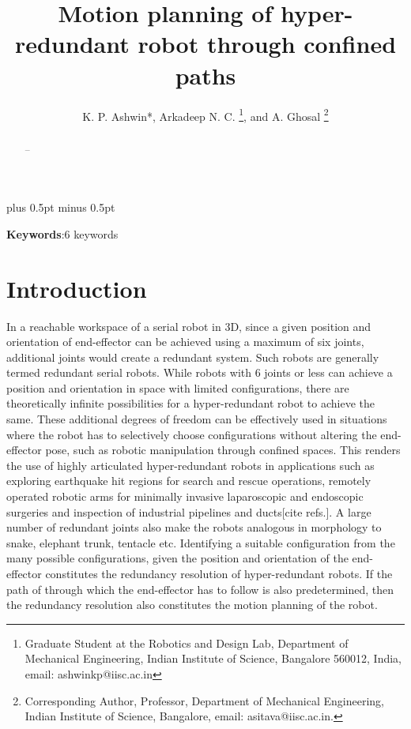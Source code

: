 \documentclass[12pt,a4]{article}
\begin{document}
%
\title{Motion planning of hyper-redundant robot through confined paths}
%
%
\author{K. P. Ashwin*, Arkadeep N. C.
\thanks{Graduate Student at the Robotics and Design Lab, Department
of Mechanical Engineering, Indian Institute of Science, Bangalore 560012, India, email: ashwinkp@iisc.ac.in}, 
 and A. Ghosal
\thanks{Corresponding Author, Professor, Department of Mechanical Engineering, Indian Institute of Science, Bangalore, email: asitava@iisc.ac.in.}}
%
\baselineskip 18pt plus 0.5pt minus 0.5pt
%
\date{}
\maketitle
\begin{abstract}
\label{sec:abstract}
--
\end{abstract}

\textbf{Keywords}:6 keywords

\section{Introduction}
\label{sec:introduction}

In a reachable workspace of a serial robot in 3D, since a given position and orientation of end-effector can be achieved using a maximum of six joints, additional joints would create a redundant system. Such robots are generally termed redundant serial robots. While robots with 6 joints  or less can achieve a position and orientation in space with limited configurations, there are theoretically infinite possibilities for a hyper-redundant robot to achieve the same. These additional degrees of freedom can be effectively used in situations where the robot has to selectively choose configurations without altering the end-effector pose, such as robotic manipulation through confined spaces. This renders the use of highly articulated hyper-redundant robots in applications such as exploring earthquake hit regions for search and rescue operations, remotely operated robotic arms for minimally invasive laparoscopic and endoscopic surgeries and inspection of industrial pipelines and ducts[cite refs.]. A large number of redundant joints also make the robots analogous in morphology to  snake, elephant trunk, tentacle etc. Identifying a suitable configuration from the many possible configurations, given the position and orientation of the end-effector constitutes the redundancy resolution of hyper-redundant robots. If the path of through which the end-effector has to follow is also predetermined, then the redundancy resolution also constitutes the motion planning of the robot.
\end{document}
